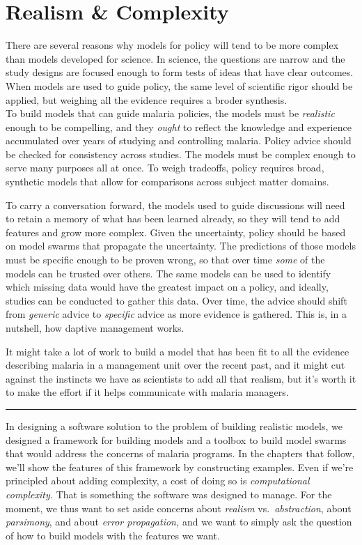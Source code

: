 \documentclass[
]{book}
\begin{document}
\hypertarget{realism-complexity}{%
\chapter{Realism \& Complexity}\label{realism-complexity}}

There are several reasons why models for policy will tend to be more complex than models developed for science.
In science, the questions are narrow and the study designs are focused enough to form tests of ideas that have clear outcomes.
When models are used to guide policy, the same level of scientific rigor should be applied, but weighing all the evidence requires a broder synthesis.\\
To build models that can guide malaria policies, the models must be \emph{realistic} enough to be compelling, and they \emph{ought} to reflect the knowledge and experience accumulated over years of studying and controlling malaria.
Policy advice should be checked for consistency across studies.
The models must be complex enough to serve many purposes all at once.
To weigh tradeoffs, policy requires broad, synthetic models that allow for comparisons across subject matter domains.

To carry a conversation forward, the models used to guide discussions will need to retain a memory of what has been learned already, so they will tend to add features and grow more complex.
Given the uncertainty, policy should be based on model swarms that propagate the uncertainty.
The predictions of those models must be specific enough to be proven wrong, so that over time \emph{some} of the models can be trusted over others.
The same models can be used to identify which missing data would have the greatest impact on a policy, and ideally, studies can be conducted to gather this data.
Over time, the advice should shift from \emph{generic} advice to \emph{specific} advice as more evidence is gathered.
This is, in a nutshell, how daptive management works.

It might take a lot of work to build a model that has been fit to all the evidence describing malaria in a management unit over the recent past, and it might cut against the instincts we have as scientists to add all that realism, but it's worth it to make the effort if it helps communicate with malaria managers.

\begin{center}\rule{0.5\linewidth}{0.5pt}\end{center}

In designing a software solution to the problem of building realistic models, we designed a framework for building models and a toolbox to build model swarms that would address the concerns of malaria programs. In the chapters that follow, we'll show the features of this framework by constructing examples. Even if we're principled about adding complexity, a cost of doing so is \emph{computational complexity.} That is something the software was designed to manage. For the moment, we thus want to set aside concerns about \emph{realism} vs.~\emph{abstraction}, about \emph{parsimony}, and about \emph{error propagation,} and we want to simply ask the question of how to build models with the features we want.
\end{document}
